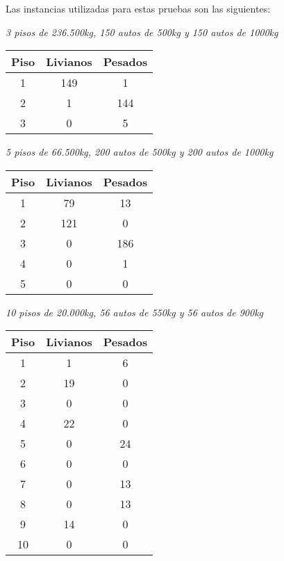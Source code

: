 \documentclass[a4paper]{article}
\begin{document}
Las instancias utilizadas para estas pruebas son las siguientes:

\vspace{2em}
\textit{3 pisos de 236.500kg, 150 autos de 500kg y 150 autos de 1000kg}
\begin{center}
\begin{tabular}{|c|c|c|}
  \hline
  Piso & Livianos & Pesados \\
  \hline
1   & 149 & 1     \\
2   & 1     & 144 \\
3   & 0     & 5     \\
\hline
\end{tabular}
\end{center}

\vspace{2em}
\textit{5 pisos de 66.500kg, 200 autos de 500kg y 200 autos de 1000kg}
\begin{center}
\begin{tabular}{|c|c|c|}
  \hline
  Piso & Livianos & Pesados \\
  \hline
1   & 79   & 13   \\
2   & 121 & 0     \\
3   & 0     & 186 \\
4   & 0     & 1     \\
5   & 0     & 0     \\
\hline
\end{tabular}
\end{center}

\vspace{2em}
\textit{10 pisos de 20.000kg, 56 autos de 550kg y 56 autos de 900kg}
\begin{center}
\begin{tabular}{|c|c|c|}
  \hline
  Piso & Livianos & Pesados \\
  \hline
1   & 1   & 6   \\
2   & 19 & 0   \\
3   & 0   & 0   \\
4   & 22 & 0   \\
5   & 0   & 24 \\
6   & 0   & 0   \\
7   & 0   & 13 \\
8   & 0   & 13 \\
9   & 14 & 0   \\
10  & 0  & 0   \\
\hline
\end{tabular}
\end{center}
\end{document}
